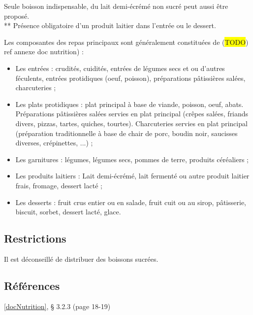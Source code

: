 \noindent * Seule boisson indispensable, du lait demi-écrémé non sucré peut aussi être proposé. \\
** Présence obligatoire d'un produit laitier dans l'entrée ou le dessert.

\vspace{0.5cm}

Les composantes des repas principaux sont généralement constituées de (\colorbox{yellow}{TODO}) ref annexe doc nutrition) : 
\begin{itemize}
	\item Les entrées : crudités, cuidités, entrées de légumes secs et ou d’autres féculents, entrées protidiques (oeuf, poisson), préparations pâtissières salées, charcuteries ;
	\item Les plats protidiques : plat principal à base de viande, poisson, oeuf, abats. Préparations pâtissières salées servies en plat principal (crêpes salées, friands divers, pizzas, tartes, quiches, tourtes). Charcuteries servies en plat principal (préparation traditionnelle à base de chair de porc, boudin noir, saucisses diverses, crépinettes, ...) ;
	\item Les garnitures : légumes, légumes secs, pommes de terre, produits céréaliers ;
	\item Les produits laitiers : Lait demi-écrémé, lait fermenté ou autre produit laitier frais, fromage, dessert lacté ;
	\item Les desserts : fruit crus entier ou en salade, fruit cuit ou au sirop, pâtisserie, biscuit, sorbet, dessert lacté, glace.
\end{itemize}

\subsection{Restrictions}

Il est déconseillé de distribuer des boissons sucrées.

\subsection{Références}

\ref{docNutrition}, § 3.2.3 (page 18-19)